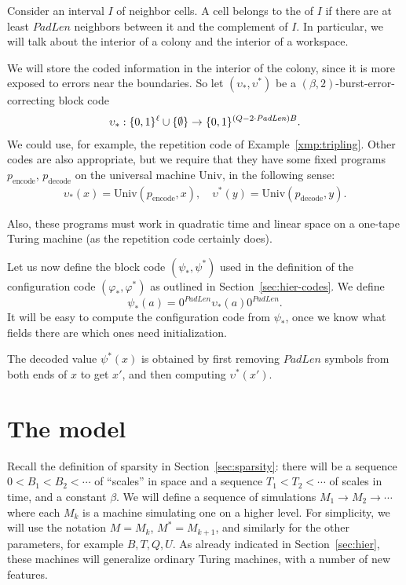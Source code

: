 \documentclass[12pt]{memoir}
\def\B{B}
\def\U{U}
\newcommand{\Q}{Q}
\newcommand{\Tu}{T}
\newcommand{\decode}{\mathrm{decode}}
\newcommand{\encode}{\mathrm{encode}}
\newcommand{\PadLen}{\mathit{PadLen}}
\newcommand{\Un}{\mathrm{Univ}}
\begin{document}
\begin{definition}[Interior]\label{def:interior}
Consider an interval \( I \) of neighbor cells.
A cell belongs to the  of \( I \) if there are at least \( \PadLen \) neighbors between it 
and the complement of \( I \).
In particular, we will talk about the interior of a colony and the interior of a workspace.
\end{definition}

We will store the coded information in the interior of the colony, since it is more exposed 
to errors near the boundaries.
So let \( (\upsilon_{*}, \upsilon^{*}) \) be a \( (\beta,2) \)-burst-error-correcting block code
\begin{align*}
  \upsilon_{*}: \{0,1\}^{\ell} \cup \set{\emptyset}
   \to\{0,1\}^{(\Q-2\cdot\PadLen)\B}.
\end{align*}
We could use, for example, the repetition code of Example~\ref{xmp:tripling}.
Other codes are also appropriate, but we require that they have some fixed
programs \( p_{\encode} \), \( p_{\decode} \)
on the universal machine \( \Un \), in the following sense:
 \begin{align*}
   \upsilon_{*}(x)=\Un(p_{\encode},x),\quad
   \upsilon^{*}(y)=\Un(p_{\decode}, y).
 \end{align*}

Also, these programs must work in quadratic time and linear space on a one-tape
Turing machine (as the repetition code certainly does).

Let us now define the block code \( (\psi_{*}, \psi^{*}) \) used in the
definition of the configuration code \( (\varphi_{*}, \varphi^{*}) \) as 
outlined in Section~\ref{sec:hier-codes}.
We define
\begin{equation}\label{eq:psi}
   \psi_{*}(a)  = 0^{\PadLen}\upsilon_{*}(a)0^{\PadLen}.
\end{equation}
It will be easy to compute the configuration code from \( \psi_{*} \),
once we know what fields there are which ones need initialization.

The decoded value \( \psi^{*}(x) \) is obtained by first removing \( \PadLen \)
symbols from both ends of \( x \) to get \( x' \), and then computing \(
\upsilon^{*}(x') \).


\section{The model}\label{sec:model}

Recall the definition of sparsity in Section~\ref{sec:sparsity}: there will be 
a sequence \( 0<\B_{1}<\B_{2}<\dotsm \) of ``scales'' in space and a sequence
\( \Tu_{1}<\Tu_{2}<\dotsm \) of scales in time, and a constant \( \beta \).
We will define a sequence of simulations \( M_{1}\to M_{2}\to\dotsm \) where
each \( M_{k} \) is a machine simulating one on a higher level.
For simplicity, we will use the notation \( M=M_{k} \), \( M^{*}=M_{k+1} \),
and similarly for the other parameters, for example \( \B,\Tu, \Q, \U \).
As already indicated in Section~\ref{sec:hier}, these machines will generalize
ordinary Turing machines, with a number of new features.
\end{document}
